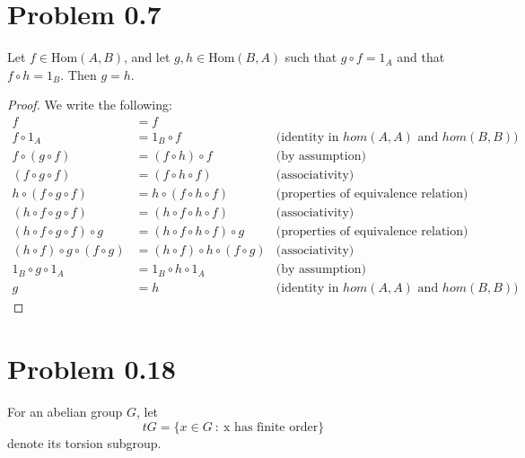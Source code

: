 \documentclass{article}
\theoremstyle{definition}
\begin{document}
\section{Problem 0.7}
    \begin{mdframed}[]
        Let $f \in \text{Hom}(A,B)$, and let $g,h \in \text{Hom}(B,A)$ such that $g \circ f = 1_A$ and that 
    $f \circ h = 1_B$. Then $g = h$.
    \end{mdframed}
    \begin{proof}
        We write the following:
        \begin{align*}
            f & = f \\
            f \circ 1_A &= 1_B \circ f & \text{(identity in $hom(A,A)$ and $hom(B,B)$)}\\
            f \circ (g \circ f) &= (f \circ h) \circ f & \text{(by assumption)}\\
            (f \circ g \circ f) &= (f \circ h \circ f) & \text{(associativity)}\\
            h \circ (f \circ g \circ f) & = h \circ (f \circ h \circ f) & \text{(properties of equivalence relation)}\\
            (h \circ f \circ g \circ f) & = (h \circ f \circ h \circ f) & \text{(associativity)}\\
            (h \circ f \circ g \circ f) \circ g & = (h \circ f \circ h \circ f) \circ g & \text{(properties of equivalence relation)}\\
            (h \circ f) \circ g \circ (f \circ g) &=(h \circ f) \circ h \circ (f \circ g) & \text{(associativity)}\\
            1_B \circ g \circ 1_A &= 1_B \circ h \circ 1_A & \text{(by assumption)}\\
            g &= h & \text{(identity in $hom(A,A)$ and $hom(B,B)$)}
        \end{align*}
    \end{proof}
\section{Problem 0.18}
    \begin{mdframed}[]
        For an abelian group $G$, let 
        \[
            tG = \{x \in G \ : \ \text{x has finite order}\}
        \]
        denote its torsion subgroup.
    \end{mdframed}
\end{document}
